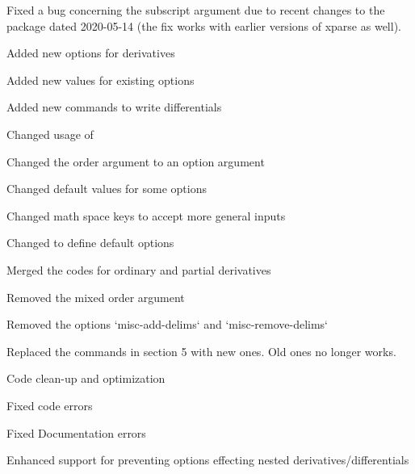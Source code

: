 \begin{changelog}
		\smallskip
		\begin{change}[version = 0.98, date = 2020-07-20, beta = true]
			\item Fixed a bug concerning the subscript argument due to recent changes to the  package dated 2020-05-14 (the fix works with earlier versions of xparse as well).
		\end{change}
		\begin{change}[version = 1.0, date = 2021-05-25, beta = false]
			\item Added new options for derivatives
			\item Added new values for existing options
			\item Added new commands to write differentials
			\item Changed usage of 
			\item Changed the order argument to an option argument
			\item Changed default values for some options
			\item Changed math space keys to accept more general inputs
			\item Changed  to define default options
			\item Merged the codes for ordinary and partial derivatives
			\item Removed the mixed order argument
			\item Removed the options `misc-add-delims` and `misc-remove-delims`
			\item Replaced the commands in section 5 with new ones. Old ones no longer works.
			\item Code clean-up and optimization
			\item Fixed code errors
			\item Fixed Documentation errors
			\item Enhanced support for preventing options effecting nested derivatives/differentials
		\end{change}
	\end{changelog}
	
